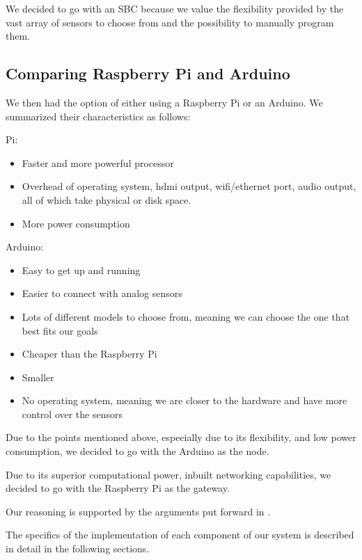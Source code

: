 		We decided to go with an SBC because we value the flexibility provided by the vast array of sensors to choose from and the possibility to manually program them.



	\subsection{Comparing Raspberry Pi and Arduino}

		We then had the option of either using a Raspberry Pi or an Arduino. We summarized their characteristics as follows:

		Pi:
		\begin{itemize}
			\item Faster and more powerful processor
			\item Overhead of operating system, hdmi output, wifi/ethernet port, audio output, all of which take physical or disk space.
			\item More power consumption
		\end{itemize}

		Arduino:
		\begin{itemize}
			\item Easy to get up and running
			\item Easier to connect with analog sensors
			\item Lots of different models to choose from, meaning we can choose the one that best fits our goals
			\item Cheaper than the Raspberry Pi
			\item Smaller 
			\item No operating system, meaning we are closer to the hardware and have more control over the sensors
		\end{itemize}

		Due to the points mentioned above, especially due to its flexibility, and low power consumption, we decided to go with the Arduino as the node.

		Due to its superior computational power, inbuilt networking capabilities, we decided to go with the Raspberry Pi as the gateway.

		Our reasoning is supported by the arguments put forward in \cite{postolache2011smart}.





The specifics of the implementation of each component of our system is described in detail in the following sections.


